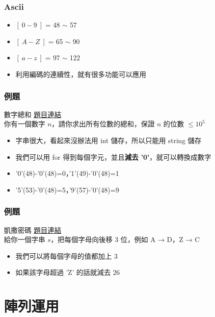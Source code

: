 \documentclass{beamer}
\begin{document}
\begin{frame}
    \frametitle{Ascii}
    \begin{itemize}
        \item $[\ 0-9\ ]$ = 48 $\sim$ 57
        \item $[\ A-Z\ ]$ = 65 $\sim$ 90
        \item $[\ a-z\ ]$ = 97 $\sim$ 122
        \item 利用編碼的連續性，就有很多功能可以應用
    \end{itemize}
\end{frame}

\begin{frame}
    \frametitle{例題}
    \begin{block}{數字總和}
        \href{https://codeforces.com/group/S6XjkGb6qB/contest/403070/problem/C}{題目連結}\\
        你有一個數字 $n$，請你求出所有位數的總和，保證 $n$ 的位數 $\leq 10^5$
    \end{block}
    \begin{itemize}
        \item<2-> 字串很大，看起來沒辦法用 int 儲存，所以只能用 string 儲存
        \item<2-> 我們可以用 for 得到每個字元，並且\textbf{減去 '0'}，就可以轉換成數字
        \item<2-> '0'(48)-'0'(48)=0，'1'(49)-'0'(48)=1
        \item<2-> '5'(53)-'0'(48)=5，'9'(57)-'0'(48)=9
    \end{itemize}
\end{frame}

\begin{frame}
    \frametitle{例題}
    \begin{block}{凱撒密碼}
        \href{https://zerojudge.tw/ShowProblem?problemid=b516}{題目連結}\\
        給你一個字串 $s$，把每個字母向後移 3 位，例如 A → D，Z → C
    \end{block}
    \begin{itemize}
        \item<2-> 我們可以將每個字母的值都加上 3
        \item<2-> 如果該字母超過 'Z' 的話就減去 26
    \end{itemize}
\end{frame}

\section{陣列運用}
\end{document}
